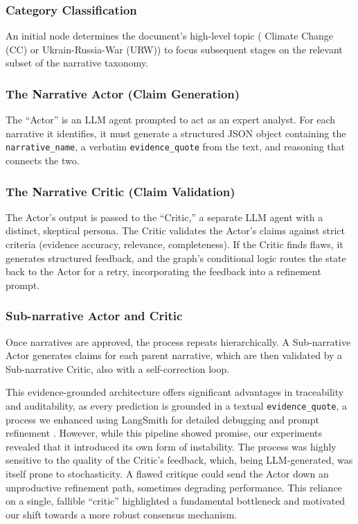 \subsubsection{Category Classification}

An initial node determines the document's high-level topic ( Climate Change (CC) or Ukrain-Russia-War (URW)) to focus subsequent stages on the relevant subset of the narrative taxonomy.

\subsubsection{The Narrative Actor (Claim Generation)}

The ``Actor'' is an LLM agent prompted to act as an expert analyst. For each narrative it identifies, it must generate a structured JSON object containing the \texttt{narrative\_name}, a verbatim \texttt{evidence\_quote} from the text, and reasoning that connects the two.

\subsubsection{The Narrative Critic (Claim Validation)}

The Actor's output is passed to the ``Critic,'' a separate LLM agent with a distinct, skeptical persona. The Critic validates the Actor's claims against strict criteria (evidence accuracy, relevance, completeness). If the Critic finds flaws, it generates structured feedback, and the graph's conditional logic routes the state back to the Actor for a retry, incorporating the feedback into a refinement prompt.

\subsubsection{Sub-narrative Actor and Critic}

Once narratives are approved, the process repeats hierarchically. A Sub-narrative Actor generates claims for each parent narrative, which are then validated by a Sub-narrative Critic, also with a self-correction loop.

This evidence-grounded architecture offers significant advantages in traceability and auditability, as every prediction is grounded in a textual \texttt{evidence\_quote}, a process we enhanced using LangSmith for detailed debugging and prompt refinement \citep{langsmith2024}. However, while this pipeline showed promise, our experiments revealed that it introduced its own form of instability. The process was highly sensitive to the quality of the Critic's feedback, which, being LLM-generated, was itself prone to stochasticity. A flawed critique could send the Actor down an unproductive refinement path, sometimes degrading performance. This reliance on a single, fallible ``critic'' highlighted a fundamental bottleneck and motivated our shift towards a more robust consensus mechanism.

